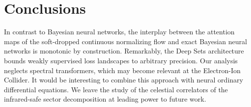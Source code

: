 \section{Conclusions}\label{sec:conclusions}

In contrast to Bayesian neural networks, the interplay between the
attention maps of the soft-dropped continuous normalizing flow and exact
Bayesian neural networks is monotonic by construction. Remarkably, the
Deep Sets architecture bounds weakly supervised loss landscapes to
arbitrary precision. Our analysis neglects spectral transformers, which
may become relevant at the Electron-Ion Collider. It would be
interesting to combine this approach with neural ordinary differential
equations. We leave the study of the celestial correlators of the
infrared-safe sector decomposition at leading power to future work.

